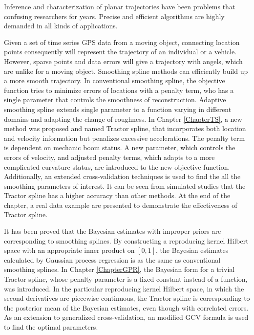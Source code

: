 
Inference and characterization of planar trajectories have been problems that confusing researchers for years. Precise and efficient algorithms are highly demanded in all kinds of applications. 

Given a set of time series GPS data from a moving object, connecting location points consequently will represent the trajectory of an individual or a vehicle. However, sparse points and data errors will give a trajectory with angels, which are unlike for a moving object. Smoothing spline methods can efficiently build up a more smooth trajectory. In conventional smoothing spline, the objective function tries to minimize errors of locations with a penalty term, who has a single parameter that controls the smoothness of reconstruction. Adaptive smoothing spline extends single parameter to a function varying in different domains and adapting the change of roughness. In Chapter \ref{ChapterTS}, a new method was proposed and named Tractor spline, that incorporates both location and velocity information but penalizes excessive accelerations. The penalty term is dependent on mechanic boom status. A new parameter, which controls the errors of velocity, and adjusted penalty terms, which adapts to a more complicated curvature status, are introduced to the new objective function. Additionally, an extended cross-validation techniques is used to find the all the smoothing parameters of interest. It can be seen from simulated studies that the Tractor spline has a higher accuracy than other methods. At the end of the chapter, a real data example are presented to demonstrate the effectiveness of Tractor spline.


It has been proved that the Bayesian estimates with improper priors are corresponding to smoothing splines. By constructing a reproducing kernel Hilbert space with an appropriate inner product on $[0,1]$, the Bayesian estimates calculated by Gaussian process regression is as the same as conventional smoothing splines. In Chapter \ref{ChapterGPR}, the Bayesian form for a trivial Tractor spline, whose penalty parameter is a fixed constant instead of a function, was introduced. In the particular reproducing kernel Hilbert space, in which the second derivatives are piecewise continuous, the Tractor spline is corresponding to the posterior mean of the Bayesian estimates, even though with correlated errors. As an extension to generalized cross-validation, an modified GCV formula is used to find the optimal parameters. 


